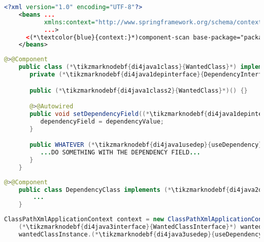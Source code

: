 \label{setterinjectionautowire}
\begin{lstlisting}[language=XML, title={Configuration XML}]
    <?xml version="1.0" encoding="UTF-8"?>
    <beans ...
           xmlns:context="http://www.springframework.org/schema/context"
           ...>
      <(*\textcolor{blue}{context:}*)component-scan base-package="package.subfolder"/>
    </beans>
\end{lstlisting}
\begin{lstlisting}[language=Java, title={Wanted class with the zero--parameter constructor and the setter method}]
    @>@Component
    public class (*\tikzmarknodebf{di4java1class}{WantedClass}*) implements (*\tikzmarknodebf{di4java1interface}{WantedClassInterface}*) {
       private (*\tikzmarknodebf{di4java1depinterface}{DependencyInterface}*) dependencyField;

       public (*\tikzmarknodebf{di4java1class2}{WantedClass}*)() {}

       @>@Autowired
       public void setDependencyField((*\tikzmarknodebf{di4java1depinterface2}{DependencyInterface}*) dependencyValue) {
          dependencyField = dependencyValue;
       }

       public WHATEVER (*\tikzmarknodebf{di4java1usedep}{useDependency}*)() {
          ...DO SOMETHING WITH THE DEPENDENCY FIELD...
       }
    }
\end{lstlisting}
\begin{lstlisting}[language=Java, title={Dependency class}]
    @>@Component
    public class DependencyClass implements (*\tikzmarknodebf{di4java2depinterface}{DependencyInterface}*) {
        ...
    }
\end{lstlisting}
\begin{lstlisting}[language=Java, title={Usage}]
    ClassPathXmlApplicationContext context = new ClassPathXmlApplicationContext("configurationFile.xml");
    (*\tikzmarknodebf{di4java3interface}{WantedClassInterface}*) wantedClassInstance = context.getBean("(*\tikzmarknodebf{di4java3beanid}{wantedClass}[ForestGreen]*)", (*\tikzmarknodebf{di4java3interface2}{WantedClassInterface}*).class);
    wantedClassInstance.(*\tikzmarknodebf{di4java3usedep}{useDependency}*)();
\end{lstlisting}

